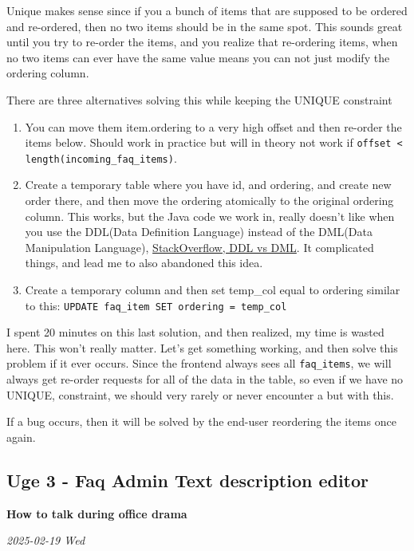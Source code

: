 \documentclass[../main.tex]{subfiles}
\begin{document}
Unique makes sense since if you a bunch of items that are supposed to be ordered and re-ordered, then no two items should be in the same spot. This sounds great until you try to re-order the items, and you realize that re-ordering items, when no two items can ever have the same value means you can not just modify the ordering column.

There are three alternatives solving this while keeping the UNIQUE constraint

\begin{enumerate}
\def\labelenumi{\arabic{enumi}.}
\item You can move them item.ordering to a very high offset and then re-order the items below. Should work in practice but will in theory not work if \verb|offset < length(incoming_faq_items)|. 

\item  Create a temporary table where you have id, and ordering, and create new order there, and then move the ordering atomically to the original ordering column. This works, but the Java code we work in, really doesn't like when you use the DDL(Data Definition Language) instead of the DML(Data Manipulation Language), \href{https://stackoverflow.com/questions/2578194/what-are-ddl-and-dml}{StackOverflow, DDL vs DML}. It complicated things, and lead me to also abandoned this idea.
\item Create a temporary column and then set temp\_col equal to ordering similar to this: \verb|UPDATE faq_item SET ordering = temp_col|
\end{enumerate}


I spent 20 minutes on this last solution, and then realized, my time is wasted here. This won't really matter. Let's get something working, and then solve this problem if it ever occurs. Since the frontend always sees all \verb|faq_items|, we will always get re-order requests for all of the data in the table, so even if we have no UNIQUE, constraint, we should very rarely or never encounter a but with this.

If a bug occurs, then it will be solved by the end-user reordering the items once again.\strut

\subsection{Uge 3 - Faq Admin Text description editor} 

\textbf{How to talk during office drama}

\textit{2025-02-19 Wed}
\end{document}
